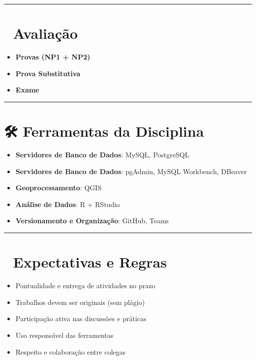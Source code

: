 \documentclass[
]{book}
\providecommand{\tightlist}{%
  \setlength{\itemsep}{0pt}\setlength{\parskip}{0pt}}
\begin{document}
\begin{center}\rule{0.5\linewidth}{0.5pt}\end{center}

\chapter{📝 Avaliação}\label{avaliauxe7uxe3o}

\begin{itemize}
\tightlist
\item
  \textbf{Provas (NP1 + NP2)}
\item
  \textbf{Prova Substitutiva}
\item
  \textbf{Exame}
\end{itemize}

\begin{center}\rule{0.5\linewidth}{0.5pt}\end{center}

\chapter{🛠️ Ferramentas da Disciplina}\label{ferramentas-da-disciplina}

\begin{itemize}
\tightlist
\item
  \textbf{Servidores de Banco de Dados}: MySQL, PostgreSQL
\item
  \textbf{Servidores de Banco de Dados}: pgAdmin, MySQL Workbench, DBeaver\\
\item
  \textbf{Geoprocessamento}: QGIS\\
\item
  \textbf{Análise de Dados}: R + RStudio\\
\item
  \textbf{Versionamento e Organização}: GitHub, Teams
\end{itemize}

\begin{center}\rule{0.5\linewidth}{0.5pt}\end{center}

\chapter{📌 Expectativas e Regras}\label{expectativas-e-regras}

\begin{itemize}
\tightlist
\item
  Pontualidade e entrega de atividades no prazo
\item
  Trabalhos devem ser originais (sem plágio)
\item
  Participação ativa nas discussões e práticas
\item
  Uso responsável das ferramentas
\item
  Respeito e colaboração entre colegas
\end{itemize}
\end{document}
